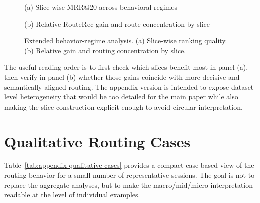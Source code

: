 \documentclass[sigconf,review,anonymous]{acmart}
\newcommand{\placeholderpanel}[1]{\fbox{\rule{0pt}{#1}\rule{0.92\linewidth}{0pt}}}
\begin{document}
\begin{figure}[t]
  \centering
  \begin{minipage}[t]{\linewidth}
    \centering
    \placeholderpanel{1.25in}

    \vspace{0.35em}
    {\footnotesize (a) Slice-wise MRR@20 across behavioral regimes}
  \end{minipage}\hfill

  \vspace{0.75em}

  \begin{minipage}[t]{\linewidth}
    \centering
    \placeholderpanel{1.25in}

    \vspace{0.35em}
    {\footnotesize (b) Relative RouteRec gain and route concentration by slice}
  \end{minipage}
  \caption{Extended behavior-regime analysis. (a) Slice-wise ranking quality. (b) Relative gain and routing concentration by slice.}
  \label{fig:appendix-behavior-slices}
\end{figure}

The useful reading order is to first check which slices benefit most in panel (a), then verify in panel (b) whether those gains coincide with more decisive and semantically aligned routing. The appendix version is intended to expose dataset-level heterogeneity that would be too detailed for the main paper while also making the slice construction explicit enough to avoid circular interpretation.

\section{Qualitative Routing Cases}
\label{app:qualitative-cases}
Table~\ref{tab:appendix-qualitative-cases} provides a compact case-based view of the routing behavior for a small number of representative sessions. The goal is not to replace the aggregate analyses, but to make the macro/mid/micro interpretation readable at the level of individual examples.
\end{document}
